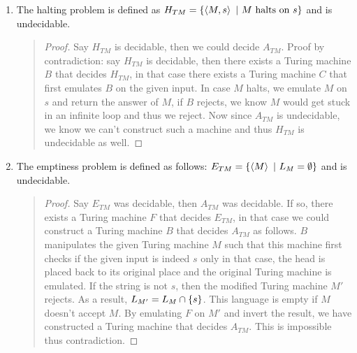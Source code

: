 \documentclass{article}
\begin{document}
\begin{prel}
\begin{enumerate}
\paragraph{}
\item The halting problem is defined as $H_{TM}=\left\{ \left\langle M,s \right\rangle\ |\ \mbox{$M$ halts on $s$} \right\}$ and is undecidable.
\begin{quote}\begin{proof}Say $H_{TM}$ is decidable, then we could decide $A_{TM}$. Proof by contradiction: say $H_{TM}$ is decidable, then there exists a Turing machine $B$ that decides $H_{TM}$, in that case there exists a Turing machine $C$ that first emulates $B$ on the given input. In case $M$ halts, we emulate $M$ on $s$ and return the answer of $M$, if $B$ rejects, we know $M$ would get stuck in an infinite loop and thus we reject. Now since $A_{TM}$ is undecidable, we know we can't construct such a machine and thus $H_{TM}$ is undecidable as well.
\end{proof}\end{quote}
\item The emptiness problem is defined as follows: $E_{TM}=\left\{ \left\langle M \right\rangle\ |\ L_M=\emptyset \right\}$ and is undecidable.
\begin{quote}\begin{proof}
Say $E_{TM}$ was decidable, then $A_{TM}$ was decidable. If so, there exists a Turing machine $F$ that decides $E_{TM}$, in that case we could construct a Turing machine $B$ that decides $A_{TM}$ as follows. $B$ manipulates the given Turing machine $M$ such that this machine first checks if the given input is indeed $s$ only in that case, the head is placed back to its original place and the original Turing machine is emulated. If the string is not $s$, then the modified Turing machine $M'$ rejects. As a result, $L_{M'}=L_{M}\cap\left\{ s \right\}$. This language is empty if $M$ doesn't accept $M$. By emulating $F$ on $M'$ and invert the result, we have constructed a Turing machine that decides $A_{TM}$. This is impossible thus contradiction.
\end{proof}\end{quote}
\end{enumerate}
\end{prel}
\end{document}
